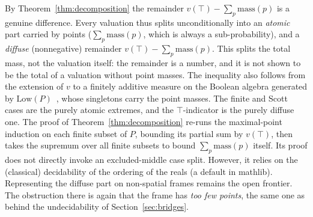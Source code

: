 \noindent
By Theorem~\ref{thm:decomposition} the remainder
$v(\top) - \sum_p \mathrm{mass}(p)$ is a genuine difference.  Every valuation thus
splits unconditionally into an \emph{atomic} part carried by points
($\sum_p \mathrm{mass}(p)$, which is always a sub-probability), and a
\emph{diffuse} (nonnegative) remainder
$v(\top) - \sum_p \mathrm{mass}(p)$.
This splits the total mass, not the valuation itself: the remainder is a
number, and it is not shown to be the total of a valuation without point
masses. The inequality also follows from the extension of $v$ to a
finitely additive measure on the Boolean algebra generated by
$\mathrm{Low}(P)$~\cite{pettis1951}, whose singletons carry the point masses. The finite and
Scott cases are the purely atomic extremes, and the $\top$-indicator
is the purely diffuse one.  The proof of
Theorem~\ref{thm:decomposition} re-runs the maximal-point induction on
each finite subset of $P$, bounding its partial sum by $v(\top)$,
then takes the supremum over all finite subsets to bound
$\sum_p \mathrm{mass}(p)$ itself.  
Its proof does not directly invoke an excluded-middle case split.
However, it relies on the (classical) decidability of the ordering
of the reals (a default in \textsf{mathlib}).
Representing the diffuse part on non-spatial frames remains the open
frontier.  The obstruction
there is again that the frame has \emph{too few points}, the same
one as behind the undecidability of Section~\ref{sec:bridges}.
